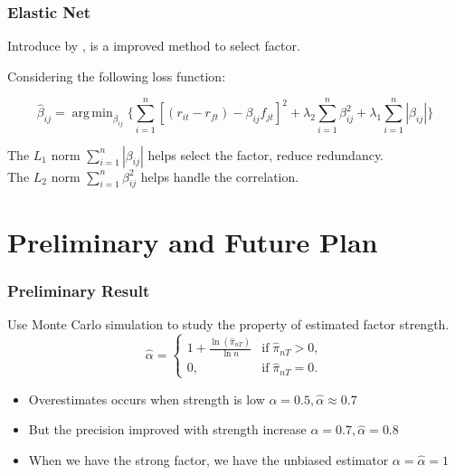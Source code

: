 \documentclass[12pt]{beamer}
\DeclareMathOperator*{\argmin}{arg\,min}
\begin{document}
\begin{frame}
\frametitle{Elastic Net}
Introduce by , is a improved method to select factor.

Considering the following loss function:

	\[   \hat{\beta}_{ij}  = \argmin_{\beta_{ij}}\{\sum_{i = 1}^{n}[(r_{it} - r_{ft}) - \beta_{ij }f_{jt}]^2 + \lambda_2\sum_{i = 1}^{n}\beta_{ij}^2  + \lambda_1\sum_{i = 1}^{n}|\beta_{ij}|     \}    \]
	
	The $L_1$ norm $\sum_{i = 1}^{n}|\beta_{ij}|$ helps select the factor, reduce redundancy.\\
    The $L_2$ norm $\sum_{i = 1}^{n}\beta_{ij}^2 $ helps handle the correlation.

\end{frame}




\section{Preliminary and Future Plan}


\begin{frame}
	\frametitle{Preliminary Result}
Use Monte Carlo simulation to study the property of estimated factor strength.\\
\[ \hat{\alpha} = \begin{cases}
1+\frac{\ln(\hat{\pi}_{nT})}{\ln n} & \text{if}\; \hat{\pi}_{nT} > 0,\\
0, & \text{if}\; \hat{\pi}_{nT} = 0.
\end{cases} \]
\begin{itemize}
\item Overestimates occurs when strength is low $\alpha = 0.5, \hat{\alpha} \approx 0.7$
\item But the precision improved with strength increase $\alpha = 0.7, \hat{\alpha} = 0.8$
\item When we have the strong factor, we have the unbiased estimator $\alpha = \hat{\alpha} = 1$
\end{itemize}
	
\end{frame}
\end{document}

